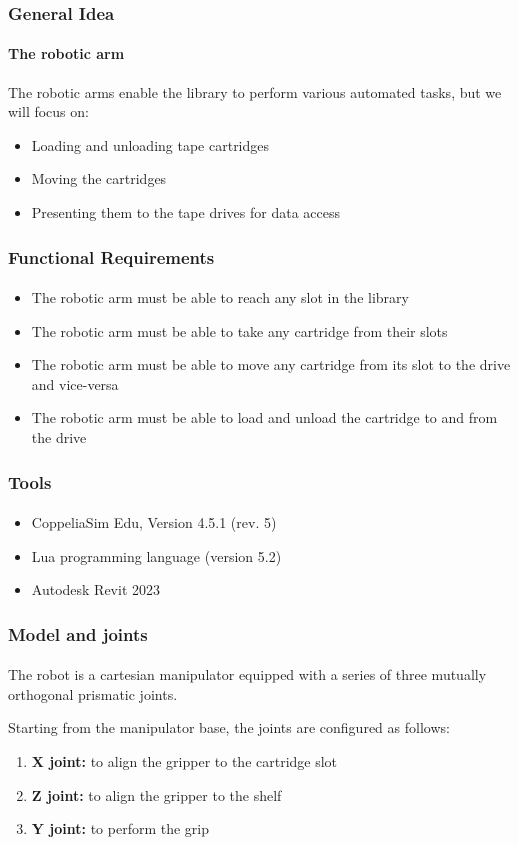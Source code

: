 \documentclass[12pt]{beamer}
\begin{document}
\begin{frame}
\frametitle{General Idea}
\framesubtitle{The robotic arm}
The robotic arms enable the library to perform various automated tasks, but we will focus on:
\begin{itemize}
    \item Loading and unloading tape cartridges
    \item Moving the cartridges
    \item Presenting them to the tape drives for data access
\end{itemize}
\end{frame}

\begin{frame}
\frametitle{Functional Requirements}
\framesubtitle{}
\begin{itemize}
    \item The robotic arm must be able to reach any slot in the library
    \item The robotic arm must be able to take any cartridge from their slots
    \item The robotic arm must be able to move any cartridge from its slot to the drive and vice-versa
    \item The robotic arm must be able to load and unload the cartridge to and from the drive
\end{itemize}
\end{frame}

\begin{frame}
\frametitle{Tools}
\framesubtitle{}
\begin{itemize}
    \item CoppeliaSim Edu, Version 4.5.1 (rev. 5)
    \item Lua programming language (version 5.2)
    \item Autodesk Revit 2023
\end{itemize}
\end{frame}

\begin{frame}
\frametitle{Model and joints}
\framesubtitle{}
The robot is a cartesian manipulator equipped with a series of three mutually orthogonal prismatic joints.

Starting from the manipulator base, the joints are configured as follows:
\begin{enumerate}
    \item \textbf{X joint:} to align the gripper to the cartridge slot
    \item \textbf{Z joint:} to align the gripper to the shelf
    \item \textbf{Y joint:} to perform the grip
\end{enumerate}
\end{frame}
\end{document}
